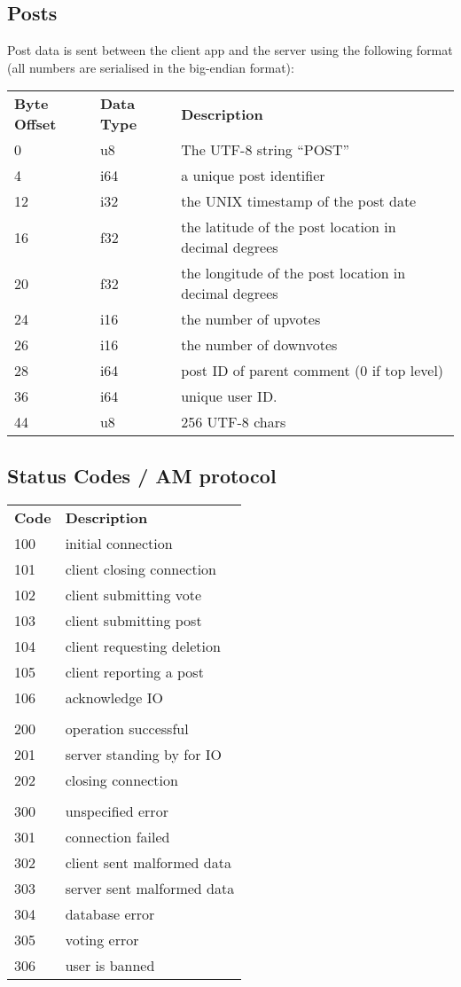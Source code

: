 \documentclass[12pt, a4paper]{article}
\begin{document}
\subsection{Posts}
Post data is sent between the client app and the server using the following format (all numbers are serialised in the big-endian format):
\begin{table}[h]
\centering
\begin{tabular}{lll}
\textbf{Byte Offset} & \textbf{Data Type} &\textbf{Description}\\
0 & u8 & The UTF-8 string ``POST''\\
4 & i64 & a unique post identifier\\
12 & i32 & the UNIX timestamp of the post date\\
16 & f32 & the latitude of the post location in decimal degrees\\
20 & f32 & the longitude of the post location in decimal degrees\\
24 & i16 & the number of upvotes\\
26 & i16 & the number of downvotes\\
28 & i64 & post ID of parent comment (0 if top level)\\
36 & i64 & unique user ID.\\
44 & u8 & 256 UTF-8 chars \\
\end{tabular}
\end{table}
\clearpage

\subsection{Status Codes / AM protocol}
\begin{table}[h]
\centering
\label{my-label}
\begin{tabular}{ll}
\textbf{Code} &\textbf{Description}\\
100 & initial connection\\
101 & client closing connection\\
102 & client submitting vote\\
103 & client submitting post\\
104 & client requesting deletion\\
105 & client reporting a post\\
106 & acknowledge IO\\
&\\
200 & operation successful\\
201 & server standing by for IO\\
202 & closing connection\\
&\\
300 & unspecified error\\
301 & connection failed\\
302 & client sent malformed data\\
303 & server sent malformed data\\
304 & database error\\
305 & voting error\\
306 & user is banned\\
\end{tabular}
\end{table}
\end{document}
